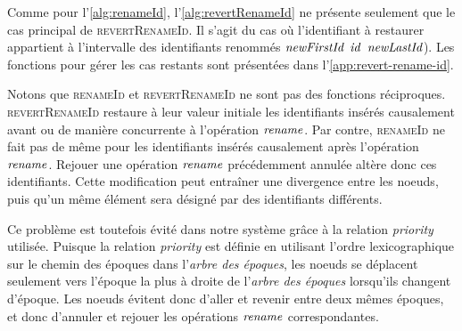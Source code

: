 
Comme pour l'\autoref{alg:renameId}, l'\autoref{alg:revertRenameId} ne présente seulement que le cas principal de \textsc{revertRenameId}.
Il s'agit du cas où l'identifiant à restaurer appartient à l'intervalle des identifiants renommés $\mathit{newFirstId}$ \leqid $\mathit{id}$ \leqid $\mathit{newLastId}$).
Les fonctions pour gérer les cas restants sont présentées dans l'\autoref{app:revert-rename-id}.

Notons que \textsc{renameId} et \textsc{revertRenameId} ne sont pas des fonctions réciproques.
\textsc{revertRenameId} restaure à leur valeur initiale les identifiants insérés causalement avant ou de manière concurrente à l'opération $\mathit{rename}$.
Par contre, \textsc{renameId} ne fait pas de même pour les identifiants insérés causalement après l'opération $\mathit{rename}$.
Rejouer une opération $\mathit{rename}$ précédemment annulée altère donc ces identifiants.
Cette modification peut entraîner une divergence entre les noeuds, puis qu'un même élément sera désigné par des identifiants différents.

Ce problème est toutefois évité dans notre système grâce à la relation \emph{priority} utilisée.
Puisque la relation \emph{priority} est définie en utilisant l'ordre lexicographique sur le chemin des époques dans l'\emph{arbre des époques}, les noeuds se déplacent seulement vers l'époque la plus à droite de l'\emph{arbre des époques} lorsqu'ils changent d'époque.
Les noeuds évitent donc d'aller et revenir entre deux mêmes époques, et donc d'annuler et rejouer les opérations $\mathit{rename}$ correspondantes.
